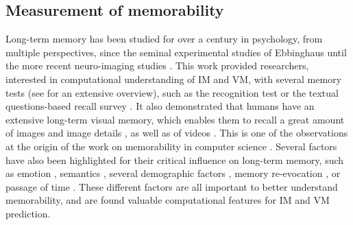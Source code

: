 \documentclass[sigconf]{acmart}
\begin{document}
\subsection{Measurement of memorability}
Long-term memory has been studied for over a century in psychology, from multiple perspectives, since the seminal experimental studies of Ebbinghaus \cite{ebbinghaus_1913_memory} until the more recent neuro-imaging studies \cite{blumenfeld_2007_prefrontal}.
This work provided researchers, interested in computational understanding of IM and VM, with several memory tests (see \cite{richardson_1988_measures} for an extensive overview), such as the recognition test \cite{isola_2011_makes,khosla_2015_understanding,han_2015_learning} or the textual questions-based recall survey \cite{shekhar_2017_show}.
It also demonstrated that humans have an extensive long-term visual memory, which enables them to recall a great amount of images \cite{standing_1973_learning} and image details \cite{brady_2008_visual}, as well as of videos \cite{furman_2007_they}.
This is one of the observations at the origin of the work on memorability in computer science \cite{isola_2011_makes}.
Several factors have also been highlighted for their critical influence on long-term memory, such as emotion \cite{kensinger_2008_memory}, semantics \cite{quillan_1966_semantic}, several demographic factors \cite{cohendet_2016_using}, memory re-evocation \cite{nadel_1997_memory}, or passage of time \cite{mcgaugh_2000_memory}.
These different factors are all important to better understand memorability, and are found valuable computational features for IM and VM prediction.
\end{document}
